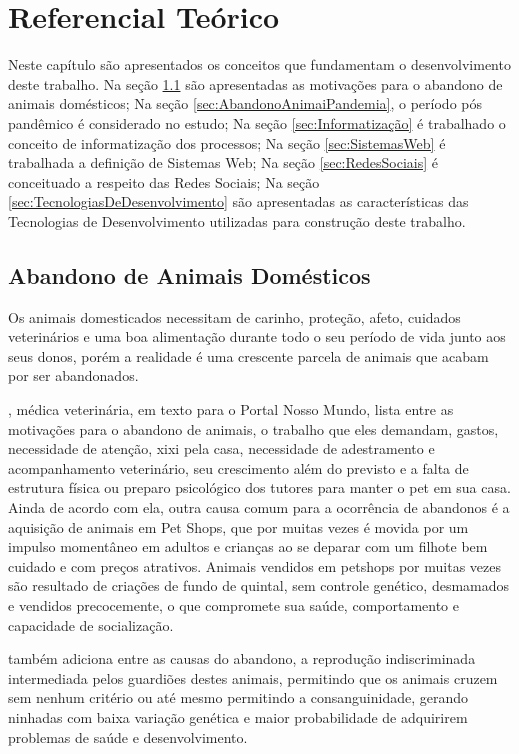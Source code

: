 %
\chapter{Referencial Teórico}
\label{cap:ReferencialTeorico}

Neste capítulo são apresentados os conceitos que fundamentam o desenvolvimento deste trabalho. Na seção \ref{sec:AbandonoAnimaisDomesticos} são apresentadas as motivações para o abandono de animais domésticos; Na seção \ref{sec:AbandonoAnimaiPandemia}, o período pós pandêmico é considerado no estudo; Na seção \ref{sec:Informatização} é trabalhado o conceito de informatização dos processos; Na seção \ref{sec:SistemasWeb} é trabalhada a definição de Sistemas Web; Na seção \ref{sec:RedesSociais} é conceituado a respeito das Redes Sociais; Na seção \ref{sec:TecnologiasDeDesenvolvimento} são apresentadas as características das Tecnologias de Desenvolvimento utilizadas para construção deste trabalho.

\section{Abandono de Animais Domésticos}
\label{sec:AbandonoAnimaisDomesticos}
Os animais domesticados necessitam de carinho, proteção, afeto,  cuidados veterinários e uma boa alimentação durante todo o seu período de vida junto aos seus donos, porém a realidade é uma crescente parcela de animais que acabam por ser abandonados.

\cite{Schultz}, médica veterinária, em texto para o  Portal Nosso Mundo,  lista entre as motivações para o abandono de animais, o trabalho que eles demandam, gastos, necessidade de atenção, xixi pela casa, necessidade de adestramento e acompanhamento veterinário, seu crescimento além do previsto e a falta de estrutura física ou preparo psicológico dos tutores para manter o pet em sua casa. Ainda de acordo com ela, outra causa comum para a ocorrência de abandonos é a aquisição de animais em Pet Shops, que por muitas vezes é movida por um impulso momentâneo em adultos e crianças ao se deparar com um filhote bem cuidado e com preços atrativos. Animais vendidos em petshops por muitas vezes são resultado de criações de fundo de quintal, sem controle genético, desmamados e vendidos precocemente, o que compromete sua saúde, comportamento e capacidade de socialização.

 também adiciona entre as causas do abandono, a reprodução indiscriminada intermediada pelos guardiões destes animais, permitindo que os animais cruzem sem nenhum critério ou até mesmo permitindo a consanguinidade, gerando ninhadas com baixa variação genética e maior probabilidade de adquirirem problemas de saúde e desenvolvimento. 

